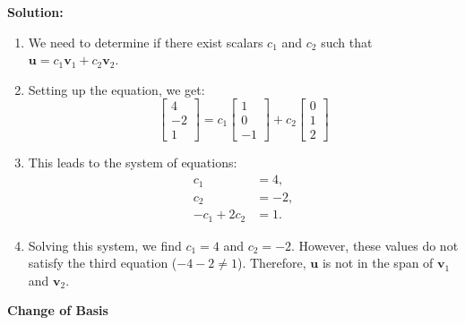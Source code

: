 \documentclass[8pt, a4paper, landscape]{extarticle}
\begin{document}
\begin{multicols*}{4}
  \textbf{Solution:}
  \begin{enumerate}
      \item We need to determine if there exist scalars $c_1$ and $c_2$ such that $\mathbf{u} = c_1\mathbf{v}_1 + c_2\mathbf{v}_2$.
      \item Setting up the equation, we get:
      \[
      \begin{bmatrix} 4 \\ -2 \\ 1 \end{bmatrix} = c_1\begin{bmatrix} 1 \\ 0 \\ -1 \end{bmatrix} + c_2\begin{bmatrix} 0 \\ 1 \\ 2 \end{bmatrix}
      \]
      \item This leads to the system of equations:
      \begin{align*}
          c_1 &= 4, \\
          c_2 &= -2, \\
          -c_1 + 2c_2 &= 1.
      \end{align*}
      \item Solving this system, we find $c_1 = 4$ and $c_2 = -2$. However, these values do not satisfy the third equation ($-4 - 2 \neq 1$). Therefore, $\mathbf{u}$ is not in the span of $\mathbf{v}_1$ and $\mathbf{v}_2$.
  \end{enumerate}
  
  \textbf{Change of Basis}


\end{multicols*}
\end{document}
